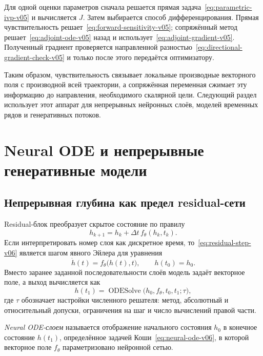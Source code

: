 Для одной оценки параметров сначала решается прямая задача~\eqref{eq:parametric-ivp-v05} и вычисляется $J$. Затем выбирается способ дифференцирования. Прямая чувствительность решает~\eqref{eq:forward-sensitivity-v05}; сопряжённый метод решает~\eqref{eq:adjoint-ode-v05} назад и использует~\eqref{eq:adjoint-gradient-v05}. Полученный градиент проверяется направленной разностью~\eqref{eq:directional-gradient-check-v05} и только после этого передаётся оптимизатору.

Таким образом, чувствительность связывает локальные производные векторного поля с производной всей траектории, а сопряжённая переменная сжимает эту информацию до направления, необходимого скалярной цели. Следующий раздел использует этот аппарат для непрерывных нейронных слоёв, моделей временных рядов и генеративных потоков.

\section{Neural ODE и непрерывные генеративные модели}
\label{sec:neural-ode-and-continuous-generative-models}

\subsection{Непрерывная глубина как предел residual-сети}

Residual-блок преобразует скрытое состояние по правилу
\begin{equation}
\label{eq:residual-step-v06}
h_{k+1}
=
h_k+\Delta t\,f_\theta(h_k,t_k).
\end{equation}
Если интерпретировать номер слоя как дискретное время, то~\eqref{eq:residual-step-v06} является шагом явного Эйлера для уравнения
\begin{equation}
\label{eq:neural-ode-v06}
\dot h(t)=f_\theta\bigl(h(t),t\bigr),
\qquad
h(t_0)=h_0.
\end{equation}
Вместо заранее заданной последовательности слоёв модель задаёт векторное поле, а выход вычисляется как
\begin{equation}
\label{eq:odesolve-layer-v06}
h(t_1)
=
\operatorname{ODESolve}
\bigl(h_0,f_\theta,t_0,t_1;\tau\bigr),
\end{equation}
где $\tau$ обозначает настройки численного решателя: метод, абсолютный и относительный допуски, ограничения на шаг и число вычислений правой части.

\begin{definition}
\emph{Neural ODE-слоем} называется отображение начального состояния $h_0$ в конечное состояние $h(t_1)$, определённое задачей Коши~\eqref{eq:neural-ode-v06}, в которой векторное поле $f_\theta$ параметризовано нейронной сетью.
\end{definition}

